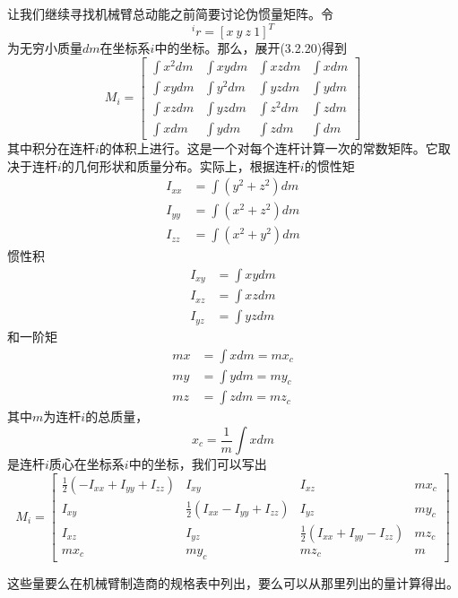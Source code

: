 \documentclass[12pt,a4paper]{ctexart}
\begin{document}
让我们继续寻找机械臂总动能之前简要讨论伪惯量矩阵。令
\begin{equation}
{^ir} = [x \ y \ z \ 1]^T
\end{equation}
为无穷小质量$dm$在坐标系$i$中的坐标。那么，展开(3.2.20)得到
\begin{equation}
M_i = \begin{bmatrix} \int x^2 dm & \int xy dm & \int xz dm & \int x dm \\ \int xy dm & \int y^2 dm & \int yz dm & \int y dm \\ \int xz dm & \int yz dm & \int z^2 dm & \int z dm \\ \int x dm & \int y dm & \int z dm & \int dm \end{bmatrix}
\end{equation}
其中积分在连杆$i$的体积上进行。这是一个对每个连杆计算一次的常数矩阵。它取决于连杆$i$的几何形状和质量分布。实际上，根据连杆$i$的惯性矩
\begin{align}
I_{xx} &= \int(y^2+z^2)dm \\ I_{yy} &= \int(x^2+z^2)dm \\ I_{zz} &= \int(x^2+y^2)dm
\end{align}
惯性积
\begin{align}
I_{xy} &= \int xy dm \\ I_{xz} &= \int xz dm \\ I_{yz} &= \int yz dm
\end{align}
和一阶矩
\begin{align}
mx &= \int x dm = mx_c \\ my &= \int y dm = my_c \\ mz &= \int z dm = mz_c
\end{align}
其中$m$为连杆$i$的总质量，
\begin{equation}
x_c = \frac{1}{m}\int x dm
\end{equation}
是连杆$i$质心在坐标系$i$中的坐标，我们可以写出
\begin{equation}
M_i = \begin{bmatrix} \frac{1}{2}(-I_{xx}+I_{yy}+I_{zz}) & I_{xy} & I_{xz} & mx_c \\ I_{xy} & \frac{1}{2}(I_{xx}-I_{yy}+I_{zz}) & I_{yz} & my_c \\ I_{xz} & I_{yz} & \frac{1}{2}(I_{xx}+I_{yy}-I_{zz}) & mz_c \\ mx_c & my_c & mz_c & m \end{bmatrix}
\end{equation}

这些量要么在机械臂制造商的规格表中列出，要么可以从那里列出的量计算得出。
\end{document}
